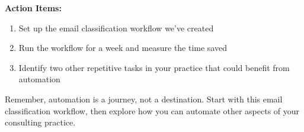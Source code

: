\textbf{Action Items:}
\begin{enumerate}
    \item Set up the email classification workflow we've created
    \item Run the workflow for a week and measure the time saved
    \item Identify two other repetitive tasks in your practice that could benefit from automation
\end{enumerate}

Remember, automation is a journey, not a destination. Start with this email classification workflow, then explore how you can automate other aspects of your consulting practice.

